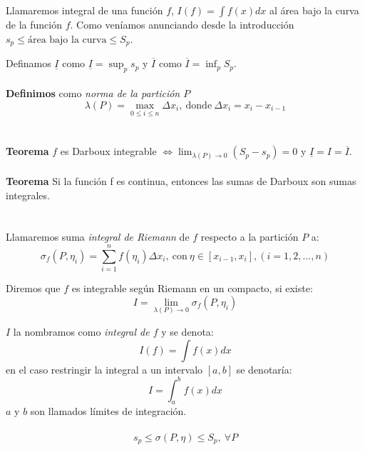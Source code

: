 \documentclass{article}
\begin{document}
Llamaremos integral de una función $f$, $I(f)=\int f(x)dx$ al área bajo la curva de la función $f$. Como veníamos anunciando desde la introducción $s_p\leq \text{área bajo la curva}\leq S_p$.

Definamos $\underline{I}$ como $\underline{I}=\sup_ps_p$ y $\overline{I}$ como $\overline{I}=\inf_pS_p$.
\\ \\
{\bf Definimos} como {\it norma de la partición $P$} $$\lambda(P)=\max_{0\leq i\leq n} \Delta x_i,\ \text{donde}\ \Delta x_i=x_i-x_{i-1}$$\\ \\
{\bf Teorema} $f$ es Darboux integrable $\Leftrightarrow \lim_{\lambda(P)\rightarrow 0}(S_p-s_p)=0$ y $\underline{I}=I=\overline{I}$.\\ \\
{\bf Teorema} Si la función f es continua, entonces las sumas de Darboux son sumas integrales.\\ \\ \\
Llamaremos suma {\it integral de Riemann} de $f$ respecto a la partición  $P$ a:
$$\sigma_f(P,\eta_i)=\sum_{i=1}^nf(\eta_i)\Delta x_i,\ \text{con}\ \eta\in[x_{i-1},x_i], (i=1,2,...,n)$$

Diremos que $f$ es integrable según Riemann en un compacto, si existe:
$$I=\lim_{\lambda(P)\rightarrow 0}\sigma_f(P,\eta_i)$$

$I$ la nombramos como {\it integral de $f$} y se denota:
$$I(f)=\int f(x)dx$$
en el caso restringir la integral a un intervalo $[a,b]$ se denotaría:
$$I=\int_a^bf(x)dx$$
$a$ y $b$ son llamados límites de integración.\\ \\

$$s_p\leq \sigma(P,\eta)\leq S_p,\ \forall P$$
\end{document}
